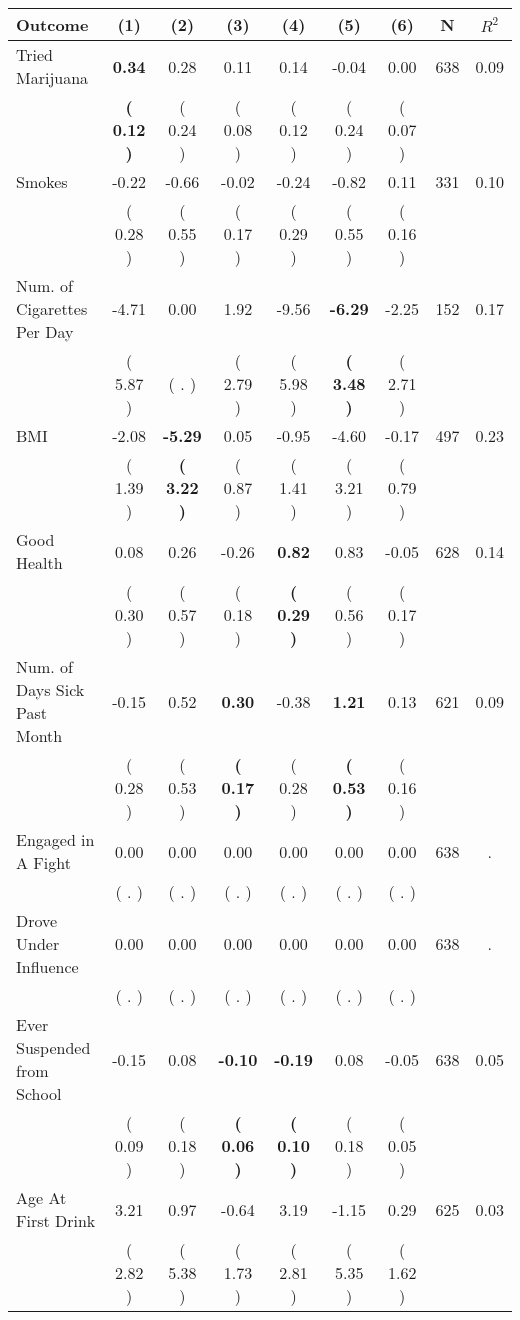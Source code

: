 \begin{tabular}{lcccccccc}
\toprule
 \textbf{Outcome} & \textbf{(1)} & \textbf{(2)} & \textbf{(3)} & \textbf{(4)} & \textbf{(5)} & \textbf{(6)} & \textbf{N} & \textbf{$ R^2$} \\
\midrule
Tried Marijuana & \textbf{     0.34} &      0.28 &      0.11 &      0.14 &     -0.04 &      0.00 & 638 &       0.09 \\ 
 & \textbf{(     0.12 )} & (     0.24 ) & (     0.08 ) & (     0.12 ) & (     0.24 ) & (     0.07 ) & \\
Smokes &     -0.22 &     -0.66 &     -0.02 &     -0.24 &     -0.82 &      0.11 & 331 &       0.10 \\ 
 & (     0.28 ) & (     0.55 ) & (     0.17 ) & (     0.29 ) & (     0.55 ) & (     0.16 ) & \\
Num. of Cigarettes Per Day &     -4.71 &      0.00 &      1.92 &     -9.56 & \textbf{    -6.29} &     -2.25 & 152 &       0.17 \\ 
 & (     5.87 ) & (        . ) & (     2.79 ) & (     5.98 ) & \textbf{(     3.48 )} & (     2.71 ) & \\
BMI &     -2.08 & \textbf{    -5.29} &      0.05 &     -0.95 &     -4.60 &     -0.17 & 497 &       0.23 \\ 
 & (     1.39 ) & \textbf{(     3.22 )} & (     0.87 ) & (     1.41 ) & (     3.21 ) & (     0.79 ) & \\
Good Health &      0.08 &      0.26 &     -0.26 & \textbf{     0.82} &      0.83 &     -0.05 & 628 &       0.14 \\ 
 & (     0.30 ) & (     0.57 ) & (     0.18 ) & \textbf{(     0.29 )} & (     0.56 ) & (     0.17 ) & \\
Num. of Days Sick Past Month &     -0.15 &      0.52 & \textbf{     0.30} &     -0.38 & \textbf{     1.21} &      0.13 & 621 &       0.09 \\ 
 & (     0.28 ) & (     0.53 ) & \textbf{(     0.17 )} & (     0.28 ) & \textbf{(     0.53 )} & (     0.16 ) & \\
Engaged in A Fight &      0.00 &      0.00 &      0.00 &      0.00 &      0.00 &      0.00 & 638 &          . \\ 
 & (        . ) & (        . ) & (        . ) & (        . ) & (        . ) & (        . ) & \\
Drove Under Influence &      0.00 &      0.00 &      0.00 &      0.00 &      0.00 &      0.00 & 638 &          . \\ 
 & (        . ) & (        . ) & (        . ) & (        . ) & (        . ) & (        . ) & \\
Ever Suspended from School &     -0.15 &      0.08 & \textbf{    -0.10} & \textbf{    -0.19} &      0.08 &     -0.05 & 638 &       0.05 \\ 
 & (     0.09 ) & (     0.18 ) & \textbf{(     0.06 )} & \textbf{(     0.10 )} & (     0.18 ) & (     0.05 ) & \\
Age At First Drink &      3.21 &      0.97 &     -0.64 &      3.19 &     -1.15 &      0.29 & 625 &       0.03 \\ 
 & (     2.82 ) & (     5.38 ) & (     1.73 ) & (     2.81 ) & (     5.35 ) & (     1.62 ) & \\
\bottomrule
\end{tabular}

